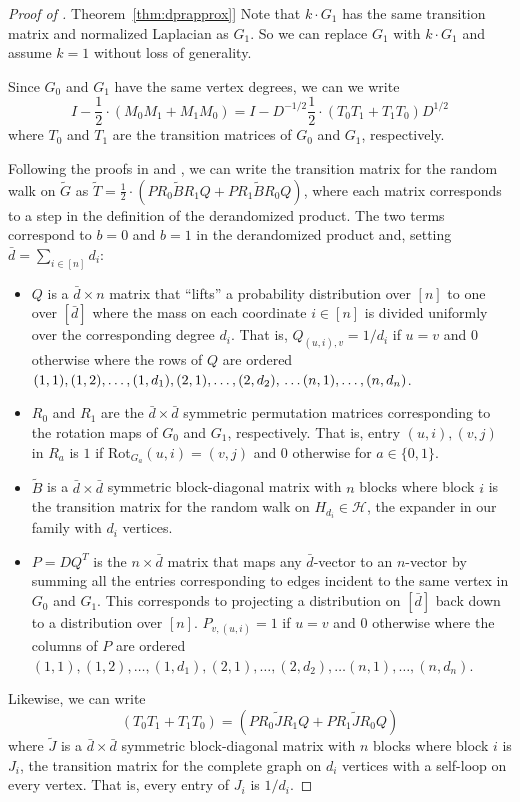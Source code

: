 \documentclass[11pt]{article}
\numberwithin{equation}{section}
\theoremstyle{definition}
\theoremstyle{plain}
\newcommand{\expref}[2]{\hyperref[#2]{#1~\ref{#2}}}
\newcommand{\wt}{\widetilde}   %
\numberwithin{myalgctr}{section}
\theoremstyle{named}
\begin{document}
\begin{proof}[Proof of \expref{Theorem}{thm:dprapprox}]
Note that $k\cdot G_1$ has the same transition matrix and normalized Laplacian as $G_1$. So we can replace $G_1$ with $k\cdot G_1$ and assume $k=1$ without loss of generality. 

Since $G_0$ and $G_1$ have the same vertex degrees, we can we write
\begin{equation}
\label{eq:1}
I-\frac{1}{2}\cdot(M_0M_1+M_1M_0) = I-D^{-1/2}\frac{1}{2}\cdot(T_0T_1+T_1T_0)D^{1/2}
\end{equation}
where $T_0$ and $T_1$ are the transition matrices of $G_0$ and $G_1$, respectively.

Following the proofs in \cite{RozenmanVa05} and \cite{derandbeyond2017}, we can write the transition matrix for the random walk on $\wt{G}$ as $\wt{T}=\frac{1}{2}\cdot(P R_0 \wt{B} R_1 Q + P R_1 \wt{B} R_0 Q)$, where each matrix corresponds to a step in the definition of the derandomized product. The two terms correspond to $b=0$ and $b=1$ in the derandomized product and, setting $\bar{d}=\sum_{i\in[n]}d_i$:
\begin{itemize}
\item $Q$ is a $\bar{d}\times n$ matrix that ``lifts'' a probability distribution over $[n]$ to one over $[\bar{d}]$ where the mass on each coordinate $i\in[n]$ is divided uniformly over the corresponding degree $d_i$. That is, $Q_{(u,i),v}=1/d_{i}$ if $u=v$ and 0 otherwise where the rows of $Q$ are ordered $(1,1),(1,2),\ldots,(1,d_1),(2,1),\ldots,(2,d_2),\\ \ldots(n,1),\ldots,(n,d_n)$.
\item $R_0$ and $R_1$ are the $\bar{d}\times \bar{d}$ symmetric permutation matrices corresponding to the rotation maps of $G_0$ and $G_1$, respectively. That is, entry $(u,i),(v,j)$ in $R_a$ is $1$ if Rot$_{G_{a}}(u,i)=(v,j)$ and 0 otherwise for $a\in\{0,1\}$.
\item $\wt{B}$ is a $\bar{d}\times \bar{d}$ symmetric block-diagonal matrix with $n$ blocks where block $i$ is the transition matrix for the random walk on $H_{d_{i}}\in\mathcal{H}$, the expander in our family with $d_i$ vertices.
\item $P=DQ^{T}$ is the $n\times \bar{d}$ matrix that maps any $\bar{d}$-vector to an $n$-vector by summing all the entries corresponding to edges incident to the same vertex in $G_0$ and $G_1$. This corresponds to projecting a distribution on $[\bar{d}]$ back down to a distribution over $[n]$. $P_{v,(u,i)}=1$ if $u=v$ and 0 otherwise where the columns of $P$ are ordered $(1,1),(1,2),\ldots,(1,d_1),(2,1),\ldots,(2,d_2),\ldots(n,1),\ldots,(n,d_n)$.
\end{itemize}
Likewise, we can write
\begin{equation}
\label{eq:2}
(T_0T_1+T_1T_0)=(P R_0 \wt{J} R_1 Q + P R_1 \wt{J} R_0 Q)
\end{equation}
where $\wt{J}$ is a $\bar{d}\times \bar{d}$ symmetric block-diagonal matrix with $n$ blocks where block $i$ is $J_i$, the transition matrix for the complete graph on $d_i$ vertices with a self-loop on every vertex. That is, every entry of $J_i$ is $1/d_i$.


\end{proof}
\end{document}
